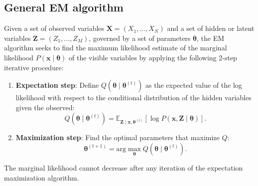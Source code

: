 \subsection{General EM algorithm}


Given a set of observed variables \( \mathbf{X} = (X_1,\dots, X_N) \) and a set of hidden or latent variables \( \mathbf{Z} = (Z_1, \dots, Z_M) \), governed by a set of parameters \( \mathbf{\theta} \), the EM algorithm seeks to find the maximum likelihood estimate of the marginal likelihood \( P(\mathbf{x} \mid \mathbf{\theta}) \)  of the visible variables by applying the following 2-step iterative procedure:
\begin{enumerate}
    \item \textbf{Expectation step}: Define \( Q(\mathbf{\theta} \mid \mathbf{\theta}^{(t)}) \) as the expected value of the log likelihood with respect to the conditional distribution  of the hidden variables given the observed:
          \[
              Q(\mathbf{\theta} \mid \mathbf{\theta}^{(t)}) = \mathbb{E}_{\mathbf{Z} \mid \mathbf{x}, \mathbf{\theta}^{(t)}} \left[ \log P(\mathbf{x}, \mathbf{Z} \mid \mathbf{\theta}) \right].
          \]
    \item \textbf{Maximization step}: Find the optimal parameters that maximize \( Q \):
          \[
              \mathbf{\theta}^{(t+1)} = \text{arg}\max_{\mathbf{\theta}} Q(\mathbf{\theta} \mid \mathbf{\theta}^{(t)}).
          \]
\end{enumerate}

\begin{nth}
    The marginal likelihood cannot decrease after any iteration of the expectation maximization algorithm.
\end{nth}

